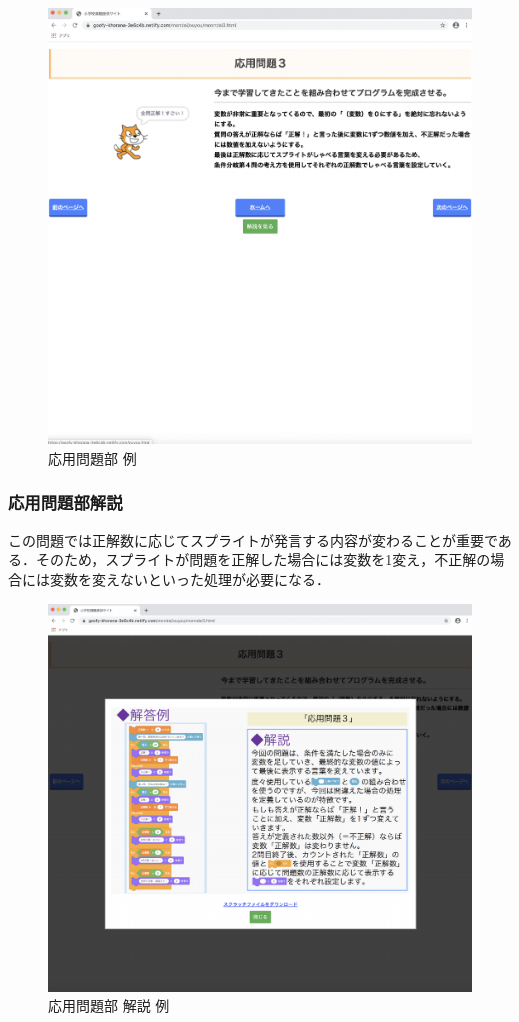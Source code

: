 \begin{figure}[h]
\begin{center}
\includegraphics[width=15cm]{ouyoutoi.pdf}
\caption{応用問題部 例}
\label{fig:houhou}
\end{center}
\end{figure}

\newpage

\subsubsection{応用問題部解説}
この問題では正解数に応じてスプライトが発言する内容が変わることが重要である．そのため，スプライトが問題を正解した場合には変数を1変え，不正解の場合には変数を変えないといった処理が必要になる．




\begin{figure}[h]
\begin{center}
\includegraphics[width=15cm]{ouyoukotae.pdf}
\caption{応用問題部 解説 例}
\label{fig:houhou}
\end{center}
\end{figure}

